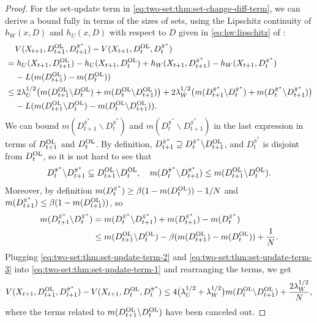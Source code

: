 \documentclass[11pt,letterpaper]{article}
\theoremstyle{plain}
\theoremstyle{definition}
\theoremstyle{remark}
\newcommand{\pibar}{{\sysbar{\pi}}}
\newcommand{\pibs}{{\pibar^*}}
\newcommand{\sysbar}[1]{\bar{#1}}
\newcommand{\wmat}{W}
\newcommand{\umat}{U}
\newcommand{\hw}{h_\wmat}
\newcommand{\hu}{h_\umat}
\newcommand{\lamw}{\lambda_\wmat}
\newcommand{\lamu}{\lambda_\umat}
\newcommand{\Da}{D^{\pibs}}
\newcommand{\Db}{D^{\textup{OL}}}
\newcommand{\Ltemp}{L}
\begin{document}
\begin{proof}
For the set-update term in \eqref{eq:two-set:thm:set-change-diff-term}, we can derive a bound fully in terms of the sizes of sets, using the Lipschitz continuity of $\hw(x, D)$ and $\hu(x, D)$ with respect to $D$ given in \eqref{eq:hw:lipschitz} of :
\begin{align}
    \nonumber
    &\mspace{20mu} V(X_{t+1}, \Db_{t+1}, \Da_{t+1}) - V(X_{t+1}, \Db_{t}, \Da_{t})  \\
    \nonumber
    &= \hu(X_{t+1}, \Db_{t+1}) - \hu(X_{t+1}, \Db_{t}) + \hw(X_{t+1}, \Da_{t+1}) - \hw(X_{t+1}, \Da_{t}) \\
    \nonumber
    &\mspace{20mu} - \Ltemp (m(\Db_{t+1}) - m(\Db_{t})) \\
    \label{eq:two-set:thm:set-update-term-1}
    &\leq 2\lamu^{1/2} \big(m(\Db_{t+1}\backslash \Db_t) + m(\Db_t \backslash \Db_{t+1})\big) + 2\lamw^{1/2} \big(m(\Da_{t+1}\backslash \Da_t) + m(\Da_t \backslash \Da_{t+1})\big)\\
    &\mspace{20mu} - \Ltemp (m(\Db_{t+1}\backslash \Db_t) - m(\Db_{t}\backslash \Db_{t+1})).
\end{align}
We can bound $m(\Da_{t+1}\backslash \Da_t)$ and $m(\Da_t \backslash \Da_{t+1})$ in the last expression in terms of $\Db_{t+1}$ and $\Db_t$. 
By definition, $\Da_{t+1} \supseteq \Da_{t} \backslash \Db_{t+1}$, and $\Da_t$ is disjoint from $\Db_t$, so it is not hard to see that
\begin{equation}
    \label{eq:two-set:thm:set-update-term-2} 
    \Da_{t}\backslash \Da_{t+1} \subseteq \Db_{t+1}\backslash \Db_t,  \quad m(\Da_{t}\backslash \Da_{t+1}) \leq m(\Db_{t+1}\backslash \Db_t).
\end{equation}
Moreover, by definition $m(\Da_t) \geq \beta (1-m(\Db_{t})) - 1/N$ and  $m(\Da_{t+1}) \leq \beta (1-m(\Db_{t+1}))$, so 
\begin{align}
    \nonumber
    m(\Da_{t+1}\backslash \Da_{t}) &= m(\Da_{t}\backslash \Da_{t+1}) + m(\Da_{t+1}) - m(\Da_{t}) \\
    \label{eq:two-set:thm:set-update-term-3} 
    &\leq m(\Db_{t+1}\backslash \Db_t) - \beta(m(\Db_{t+1}) - m(\Db_t)) + \frac{1}{N}. 
\end{align}
Plugging \eqref{eq:two-set:thm:set-update-term-2} and \eqref{eq:two-set:thm:set-update-term-3} into \eqref{eq:two-set:thm:set-update-term-1}
and rearranging the terms, we get 
\begin{align}
     V(X_{t+1}, \Db_{t+1}, \Da_{t+1}) - V(X_{t+1}, \Db_{t}, \Da_{t}) 
     \label{eq:two-set:thm:set-update-term-4} 
    \leq 4\big(\lamu^{1/2} + \lamw^{1/2}\big) m(\Db_t \backslash \Db_{t+1}) + \frac{2\lamw^{1/2}}{N}, 
\end{align}
where the terms related to $m(\Db_{t+1}\backslash \Db_t)$ have been canceled out. 


\end{proof}
\end{document}
